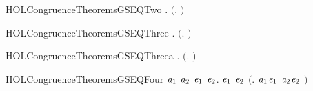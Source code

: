 \newcommand{\HOLCongruenceTheoremsGSEQOne}{\UseVerbatim{HOLCongruenceTheoremsGSEQOne}}
\begin{SaveVerbatim}{HOLCongruenceTheoremsGSEQTwo}
\HOLTokenTurnstile{} \HOLSymConst{\HOLTokenForall{}}.  \ensuremath{(}\HOLTokenLambda{}. \ensuremath{)}
\end{SaveVerbatim}
\newcommand{\HOLCongruenceTheoremsGSEQTwo}{\UseVerbatim{HOLCongruenceTheoremsGSEQTwo}}
\begin{SaveVerbatim}{HOLCongruenceTheoremsGSEQThree}
\HOLTokenTurnstile{} \HOLSymConst{\HOLTokenForall{}} .   \HOLSymConst{\HOLTokenImp{}}  \ensuremath{(}\HOLTokenLambda{}. \HOLSymConst{\ensuremath{\ldotp}} \ensuremath{)}
\end{SaveVerbatim}
\newcommand{\HOLCongruenceTheoremsGSEQThree}{\UseVerbatim{HOLCongruenceTheoremsGSEQThree}}
\begin{SaveVerbatim}{HOLCongruenceTheoremsGSEQThreea}
\HOLTokenTurnstile{} \HOLSymConst{\HOLTokenForall{}}.  \ensuremath{(}\HOLTokenLambda{}. \HOLSymConst{\ensuremath{\ldotp}}\ensuremath{)}
\end{SaveVerbatim}
\newcommand{\HOLCongruenceTheoremsGSEQThreea}{\UseVerbatim{HOLCongruenceTheoremsGSEQThreea}}
\begin{SaveVerbatim}{HOLCongruenceTheoremsGSEQFour}
\HOLTokenTurnstile{} \HOLSymConst{\HOLTokenForall{}}\ensuremath{\HOLBoundVar{a}\sb{\mathrm{1}}} \ensuremath{\HOLBoundVar{a}\sb{\mathrm{2}}} \ensuremath{\HOLBoundVar{e}\sb{\mathrm{1}}} \ensuremath{\HOLBoundVar{e}\sb{\mathrm{2}}}.
        \ensuremath{\HOLBoundVar{e}\sb{\mathrm{1}}} \HOLSymConst{\HOLTokenConj{}}  \ensuremath{\HOLBoundVar{e}\sb{\mathrm{2}}} \HOLSymConst{\HOLTokenImp{}}  \ensuremath{(}\HOLTokenLambda{}. \ensuremath{\HOLBoundVar{a}\sb{\mathrm{1}}}\HOLSymConst{\ensuremath{\ldotp}}\ensuremath{\HOLBoundVar{e}\sb{\mathrm{1}}}  \HOLSymConst{\ensuremath{+}} \ensuremath{\HOLBoundVar{a}\sb{\mathrm{2}}}\HOLSymConst{\ensuremath{\ldotp}}\ensuremath{\HOLBoundVar{e}\sb{\mathrm{2}}} \ensuremath{)}
\end{SaveVerbatim}
\newcommand{\HOLCongruenceTheoremsGSEQFour}{\UseVerbatim{HOLCongruenceTheoremsGSEQFour}}
